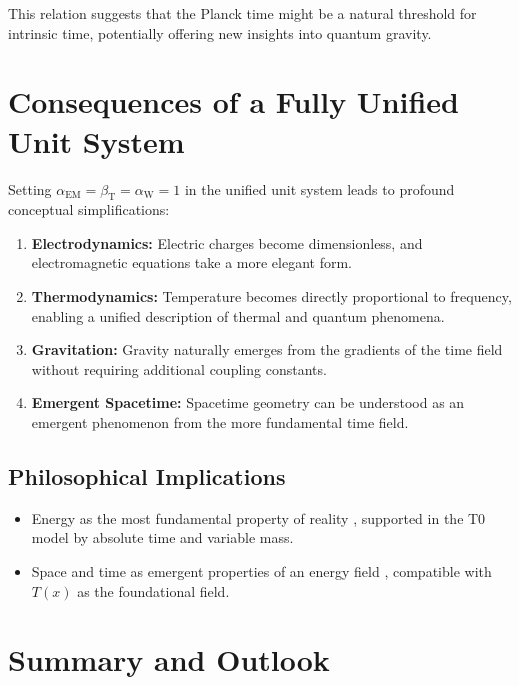 \documentclass[12pt,a4paper]{article}
\newcommand{\Tfield}{T(x)}
\newcommand{\betaT}{\beta_{\text{T}}}
\newcommand{\alphaEM}{\alpha_{\text{EM}}}
\newcommand{\alphaW}{\alpha_{\text{W}}}
\begin{document}
	This relation suggests that the Planck time might be a natural threshold for intrinsic time, potentially offering new insights into quantum gravity.
	
	\section{Consequences of a Fully Unified Unit System}
	
	Setting \(\alphaEM = \betaT = \alphaW = 1\) in the unified unit system leads to profound conceptual simplifications:
	
	\begin{enumerate}
		\item \textbf{Electrodynamics:} Electric charges become dimensionless, and electromagnetic equations take a more elegant form.
		\item \textbf{Thermodynamics:} Temperature becomes directly proportional to frequency, enabling a unified description of thermal and quantum phenomena.
		\item \textbf{Gravitation:} Gravity naturally emerges from the gradients of the time field without requiring additional coupling constants.
		\item \textbf{Emergent Spacetime:} Spacetime geometry can be understood as an emergent phenomenon from the more fundamental time field.
	\end{enumerate}
	
	\subsection{Philosophical Implications}
	
	\begin{itemize}
		\item Energy as the most fundamental property of reality \cite{Wilczek2008}, supported in the T0 model by absolute time and variable mass.
		\item Space and time as emergent properties of an energy field \cite{Verlinde2011}, compatible with \(\Tfield\) as the foundational field.
	\end{itemize}
	
	\section{Summary and Outlook}
	
\end{document}
